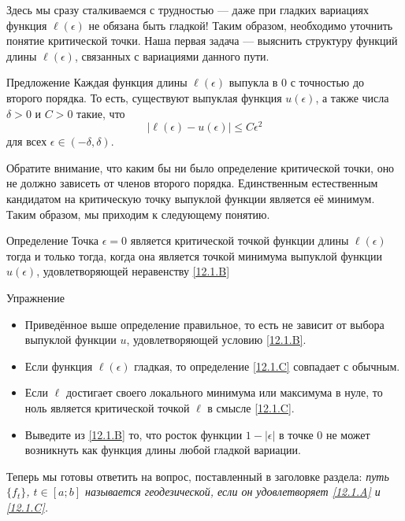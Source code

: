 Здесь мы сразу сталкиваемся с трудностью --- даже при гладких вариациях функция $\ell(\epsilon)$ не обязана быть гладкой!
Таким образом, необходимо уточнить понятие критической точки.
Наша первая задача --- выяснить структуру функций длины $\ell(\epsilon)$, связанных с вариациями данного пути.

\begin{ex}{Предложение}\label{12.1.B}
Каждая функция длины $\ell(\epsilon)$ выпукла в $0$ с точностью до второго порядка.
То есть, существуют выпуклая функция $u(\epsilon)$, а также числа $\delta > 0$ и $C > 0$ такие, что 
\[|\ell(\epsilon) - u(\epsilon)| \le C\epsilon^2\]
для всех $\epsilon \in (-\delta, \delta)$.
\end{ex}

Обратите внимание, что каким бы ни было определение критической точки, оно не должно зависеть от членов второго порядка.
Единственным естественным кандидатом на критическую точку выпуклой функции является её минимум.
Таким образом, мы приходим к следующему понятию.

\begin{ex}{Определение}\label{12.1.C}
Точка $\epsilon = 0$ является критической точкой функции длины $\ell(\epsilon)$ тогда и только тогда, когда она является точкой минимума выпуклой функции $u(\epsilon)$, удовлетворяющей неравенству \ref{12.1.B}
\end{ex}

\begin{ex}{Упражнение}\label{12.1.D}
\begin{itemize}

\item Приведённое выше определение правильное, то есть не зависит от выбора выпуклой функции $u$, удовлетворяющей условию \ref{12.1.B}.


\item Если функция $\ell(\epsilon)$ гладкая, то определение \ref{12.1.C} совпадает с обычным.


\item Если $\ell$ достигает своего локального минимума или максимума в
  нуле, то ноль является критической точкой $\ell$ в смысле
  \ref{12.1.C}. 


\item Выведите из \ref{12.1.B} то, что росток функции $1 - |\epsilon|$
  в точке $0$ не может возникнуть как функция длины любой гладкой
  вариации.
\end{itemize}
\end{ex}

Теперь мы готовы ответить на вопрос, поставленный в заголовке раздела: \emph{путь $\{f_t\}$, $t\in[a; b]$ называется геодезической, если он удовлетворяет \ref{12.1.A} и \ref{12.1.C}.}

